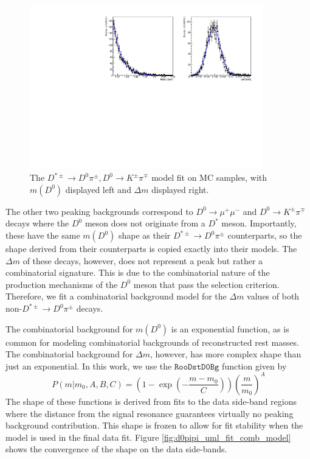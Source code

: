 \begin{figure}[htp]
    \begin{center}
      \includegraphics[width=0.9\textwidth]{figures/chapter4/normalization_fit/dpipi_fit_mc_kpi.pdf}
    \end{center}
    \caption{
      The $D^{*\pm} \to D^0\pi^\pm, D^0 \to K^\pm \pi^\mp$ model fit on MC samples, with $m(D^0)$ displayed left and $\Delta m$ displayed right.
    }
    \label{fig:d0pipi_uml_fit_kpi_model}
\end{figure}

The other two peaking backgrounds correspond to $D^0 \to \mu^+ \mu^-$ and $D^0 \to K^\pm \pi^\mp$ decays where the $D^0$ meson does not originate from a $D^*$ meson. Importantly, these have the same $m(D^0)$ shape as their $D^{*\pm} \to D^0 \pi^\pm$ counterparts, so the shape derived from their counterparts is copied exactly into their models. The $\Delta m$ of these decays, however, does not represent a peak but rather a combinatorial signature. This is due to the combinatorial nature of the production mechanisms of the $D^0$ meson that pass the selection criterion. Therefore, we fit a combinatorial background model for the $\Delta m$ values of both non-$D^{*\pm} \to D^0 \pi^\pm$ decays. 

The combinatorial background for $m(D^0)$ is an exponential function, as is common for modeling combinatorial backgrounds of reconstructed rest masses. The combinatorial background for $\Delta m$, however, has more complex shape than just an exponential. In this work, we use the $\texttt{RooDstD0Bg}$ function \cite{ref:verkerke2003roofit} given by
\begin{equation}
    P(m|m_0, A, B, C) = \left(1 - \exp \left(-\frac{m-m_0}{C} \right) \right) \left( \frac{m}{m_0}\right)^A
\end{equation}
The shape of these functions is derived from fits to the data side-band regions where the distance from the signal resonance guarantees virtually no peaking background contribution. This shape is frozen to allow for fit stability when the model is used in the final data fit. Figure \ref{fig:d0pipi_uml_fit_comb_model} shows the convergence of the shape on the data side-bands.

